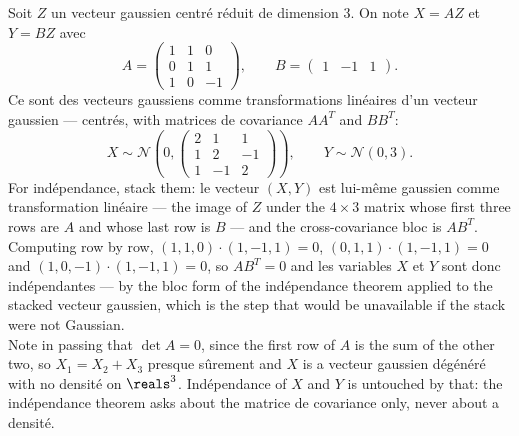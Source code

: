 \begin{example}
Soit $Z$ un vecteur gaussien centré réduit de dimension $3$. On note $X = AZ$ et
$Y = BZ$ avec
\[
  A = \begin{pmatrix} 1 & 1 & 0 \\ 0 & 1 & 1 \\ 1 & 0 & -1 \end{pmatrix},
  \qquad
  B = \begin{pmatrix} 1 & -1 & 1 \end{pmatrix} .
\]
Ce sont des vecteurs gaussiens comme transformations linéaires d'un vecteur
gaussien --- centrés, with matrices de covariance $AA^{T}$ and $BB^{T}$:
\[
  X \sim \mathcal{N}\!\left(0,
    \begin{pmatrix} 2 & 1 & 1 \\ 1 & 2 & -1 \\ 1 & -1 & 2 \end{pmatrix}\right),
  \qquad
  Y \sim \mathcal{N}(0,3) .
\]
For indépendance, stack them: le vecteur $(X,Y)$ est lui-même gaussien comme
transformation linéaire --- the image of $Z$ under the $4 \times 3$
matrix whose first three rows are $A$ and whose last row is $B$ --- and the
cross-covariance bloc is $AB^{T}$. Computing row by row,
$(1,1,0)\cdot(1,-1,1) = 0$, $(0,1,1)\cdot(1,-1,1) = 0$ and
$(1,0,-1)\cdot(1,-1,1) = 0$, so $AB^{T} = 0$ and les variables $X$ et $Y$ sont
donc indépendantes --- by the bloc form of the indépendance theorem applied to
the stacked vecteur gaussien, which is the step that would be unavailable if the
stack were not Gaussian.\\

Note in passing that $\det A = 0$, since the first row of $A$ is the sum of the
other two, so $X_{1} = X_{2} + X_{3}$ presque sûrement and $X$ is a vecteur
gaussien dégénéré with no densité on $\reals^{3}$. Indépendance of $X$ and $Y$ is
untouched by that: the indépendance theorem asks about the matrice de covariance
only, never about a densité.
\end{example}

